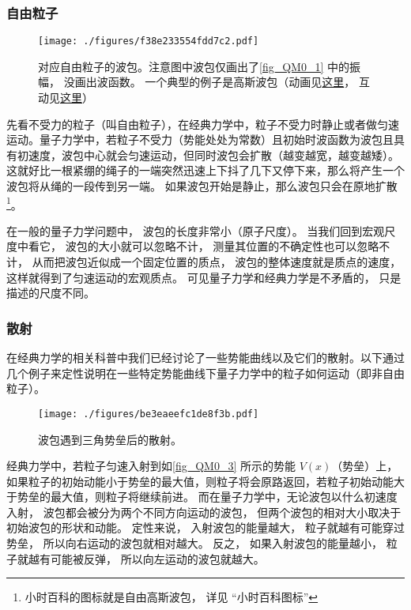 \subsubsection{自由粒子}

\begin{figure}[ht]
\centering
\texttt{[image: ./figures/f38e233554fdd7c2.pdf]}
\caption{对应自由粒子的波包。注意图中波包仅画出了\autoref{fig_QM0_1} 中的振幅， 没画出波函数。 一个典型的例子是高斯波包（动画见\href{https://wuli.wiki/apps/free_gauss.html}{这里}， 互动见\href{https://wuli.wiki/apps/gausWP.html}{这里}）} \label{fig_QM0_2}
\end{figure}

先看不受力的粒子（叫自由粒子），在经典力学中，粒子不受力时静止或者做匀速运动。量子力学中，若粒子不受力（势能处处为常数）且初始时波函数为波包且具有初速度，波包中心就会匀速运动，但同时波包会扩散（越变越宽，越变越矮）。这就好比一根紧绷的绳子的一端突然迅速上下抖了几下又停下来，那么将产生一个波包将从绳的一段传到另一端。 如果波包开始是静止，那么波包只会在原地扩散\footnote{小时百科的图标就是自由高斯波包， 详见 “小时百科图标”}。

在一般的量子力学问题中， 波包的长度非常小（原子尺度）。 当我们回到宏观尺度中看它， 波包的大小就可以忽略不计， 测量其位置的不确定性也可以忽略不计， 从而把波包近似成一个固定位置的质点， 波包的整体速度就是质点的速度， 这样就得到了匀速运动的宏观质点。 可见量子力学和经典力学是不矛盾的， 只是描述的尺度不同。

\subsubsection{散射}
在经典力学的相关科普中我们已经讨论了一些势能曲线以及它们的散射。以下通过几个例子来定性说明在一些特定势能曲线下量子力学中的粒子如何运动（即非自由粒子）。

\begin{figure}[ht]
\centering
\texttt{[image: ./figures/be3eaeefc1de8f3b.pdf]}
\caption{波包遇到三角势垒后的散射。} \label{fig_QM0_3} %
\end{figure}

经典力学中，若粒子匀速入射到如\autoref{fig_QM0_3} 所示的势能 $V(x)$（势垒）上， 如果粒子的初始动能小于势垒的最大值，则粒子将会原路返回，若粒子初始动能大于势垒的最大值，则粒子将继续前进。 而在量子力学中，无论波包以什么初速度入射， 波包都会被分为两个不同方向运动的波包， 但两个波包的相对大小取决于初始波包的形状和动能。 定性来说， 入射波包的能量越大， 粒子就越有可能穿过势垒， 所以向右运动的波包就相对越大。 反之， 如果入射波包的能量越小， 粒子就越有可能被反弹， 所以向左运动的波包就越大。

